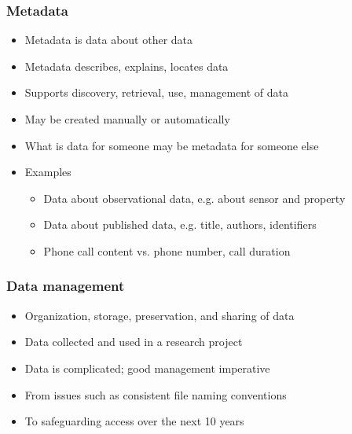 \documentclass{beamer}
\begin{document}
\begin{frame}
  \frametitle{Metadata}
  
  \begin{itemize}
  \item Metadata is data about other data
  \item Metadata describes, explains, locates data
  \item Supports discovery, retrieval, use, management of data
  \item May be created manually or automatically
  \item What is data for someone may be metadata for someone else
  \item Examples
  \begin{itemize}
    \item Data about observational data, e.g. about sensor and property
    \item Data about published data, e.g. title, authors, identifiers
    \item Phone call content vs. phone number, call duration
  \end{itemize}
  \end{itemize}
\end{frame}

\begin{frame}
  \frametitle{Data management}
  
  \begin{itemize}
  \item Organization, storage, preservation, and sharing of data 
  \item Data collected and used in a research project 
  \item Data is complicated; good management imperative
  \item From issues such as consistent file naming conventions
  \item To safeguarding access over the next 10 years
  \end{itemize}
\end{frame}
\end{document}
